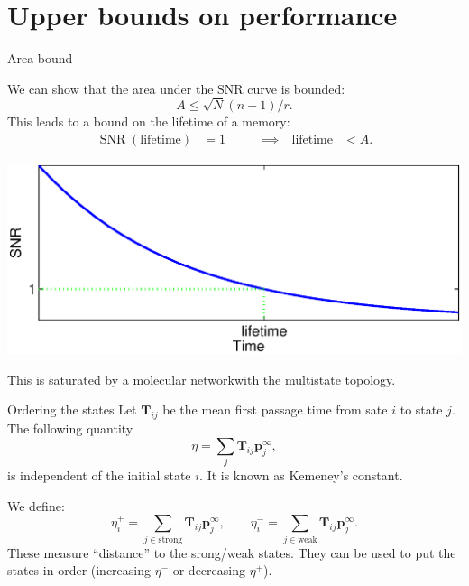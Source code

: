 \documentclass[final,hyperref={pdfpagelabels=false,bookmarks=false}]{beamer}
\newcommand{\citerr}[1]{\hfill {\footnotesize{\color{darkgrey}\cite{#1}}}}
\DeclareMathOperator{\SNR}{SNR}
\newcommand{\net}{molecular network}
\newcommand{\eq}{\mathbf{p}^\infty}
\newcommand{\fpt}{\mathbf{T}}
\begin{document}
\begin{frame}{}
\begin{columns}[t]
\begin{column}{0.37\linewidth}
\section{Upper bounds on performance}


\begin{block}{Area bound}
%
\parbox[c]{20cm}{
 We can show that the area under the SNR curve is bounded:
 \begin{equation*}
   A \leq \sqrt{N}(n-1)/r.
 \end{equation*}
 This leads to a bound on the lifetime of a memory:\\
 \begin{equation*}
 \begin{aligned}
   \SNR(\text{lifetime})&=1
   &\qquad
   \implies
   \quad
   \text{lifetime} &< A.
 \end{aligned}
 \end{equation*}
}
\hfill
\parbox[c]{16cm}{
 \begin{center}
   \includegraphics[width=15cm]{lifetime.eps}
 \end{center}
}

 This is saturated by a \net with the multistate topology.
%
\end{block}


\begin{block}{Ordering the states}
%
 Let $\fpt_{ij}$ be the mean first passage time from sate $i$ to state $j$.
 The following quantity
 \begin{equation*}
   \eta = \sum_j \fpt_{ij} \eq_j,
 \end{equation*}
 is independent of the initial state $i$.
 It is known as Kemeney's constant. \citerr{kemeny1960finite}

 \vp We define:
 \begin{equation*}
   \eta^+_i = \sum_{j\in\text{strong}} \fpt_{ij} \eq_j,
   \qquad
   \eta^-_i = \sum_{j\in\text{weak}} \fpt_{ij} \eq_j.
 \end{equation*}
 These measure ``distance'' to the srong/weak states.
 They can be used to put the states in order (increasing $\eta^-$ or decreasing $\eta^+$).
%
\end{block}


\end{column}
\end{columns}
\end{frame}
\end{document}
